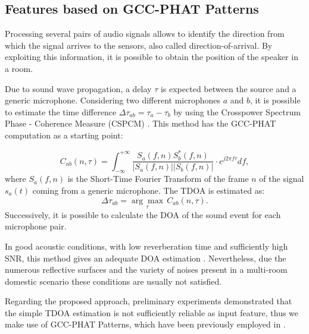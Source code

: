 \documentclass[review]{elsarticle}
\begin{document}
\subsection{Features based on GCC-PHAT Patterns}
\label{sec:features}

Processing several pairs of audio signals allows to identify the direction from which the signal arrives to the sensors, also called direction-of-arrival. By exploiting this information, it is possible to obtain the position of the speaker in a room. 

Due to sound wave propagation, a delay $\tau$ is expected between the source and a generic microphone. Considering two different microphones $a$ and $b$, it is possible to estimate the time difference $\Delta\tau_{ab} = \tau_a -\tau_b$ by using the Crosspower Spectrum Phase - Coherence Measure (CSPCM) \cite{knapp1976generalized}. %
This method has the GCC-PHAT computation as a starting point:

\begin{equation}
\label{eq:CSPCM}
C_{ab}(n,\tau) =  \int_{-\infty}^{+\infty}{\frac{S_a(f,n) S_b^*(f,n)}{|S_a(f,n)| |S_b(f,n)|} \cdot e^{j2 \pi f \tau} df },
\end{equation}
where $S_a(f,n)$ is the Short-Time Fourier Transform of the frame $n$ of the signal $s_a(t)$ coming from a generic microphone. The TDOA is estimated as:
\begin{equation}\label{eq:tdoa}
\Delta\tau_{ab} = \underset{\tau}{\arg \max}\, C_{ab}(n,\tau).
\end{equation}
Successively, it is possible to calculate the DOA of the sound event for each microphone pair. 

In good acoustic conditions, with low reverberation time and sufficiently high SNR, this method gives an adequate DOA estimation \cite{zhang2008Phat}.
Nevertheless, due the numerous reflective surfaces and the variety of noises present in a multi-room domestic scenario these conditions are usually not satisfied.

Regarding the proposed approach, preliminary experiments demonstrated that the simple TDOA estimation is not sufficiently reliable as input feature, thus we make use of GCC-PHAT Patterns, which have been previously employed in \cite{xiao2015learning}.
\end{document}
